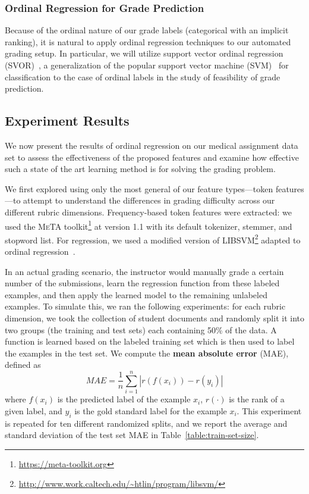 \subsubsection{Ordinal Regression for Grade Prediction}

Because of the ordinal nature of our grade labels (categorical with an
implicit ranking), it is natural to apply ordinal regression techniques to
our automated grading setup. In particular, we will utilize support vector
ordinal regression (SVOR)~\cite{Chu:2007:SVOR}, a generalization of the
popular support vector machine (SVM)~\cite{Cortes:1995:SVM} for
classification to the case of ordinal labels in the study of feasibility of
grade prediction.

\subsection{Experiment Results}

We now present the results of ordinal regression on our medical assignment
data set to assess the effectiveness of the proposed features and examine
how effective such a state of the art learning method is for solving the
grading problem.

We first explored using only the most general of our feature types---token
features---to attempt to understand the differences in grading difficulty
across our different rubric dimensions. Frequency-based token features were
extracted: we used the \textsc{MeTA}
toolkit\footnote{\url{https://meta-toolkit.org}} at version 1.1
with its default tokenizer, stemmer, and stopword list. For regression, we
used a modified version of
\textsc{LIBSVM}\footnote{\url{http://www.work.caltech.edu/~htlin/program/libsvm/}}
adapted to ordinal regression~\cite{Li:2007:NIPS}.

In an actual grading scenario, the instructor would manually grade a
certain number of the submissions, learn the regression function from these
labeled examples, and then apply the learned model to the remaining
unlabeled examples. To simulate this, we ran the following experiments: for
each rubric dimension, we took the collection of student documents and
randomly split it into two groups (the training and test sets) each
containing 50\% of the data. A function is learned based on the labeled
training set which is then used to label the examples in the test set. We
compute the \textbf{mean absolute error} (MAE), defined as
\[
MAE = \frac{1}{n} \sum_{i=1}^n | r(f(x_i)) - r(y_i) |
\]
where $f(x_i)$ is the predicted label of the example $x_i$, $r(\cdot)$ is
the rank of a given label, and $y_i$ is the gold standard label for the
example $x_i$. This experiment is repeated for ten different randomized
splits, and we report the average and standard deviation of the test set
MAE in Table~\ref{table:train-set-size}.

